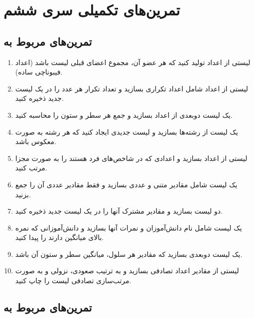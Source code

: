 \documentclass[a4paper,12pt]{article}
\begin{document}
	
	
	\newpage
	\section*{تمرین‌های تکمیلی سری ششم}
	
	\subsection*{تمرین‌های مربوط به }
	
	\begin{enumerate}
		\item لیستی از اعداد تولید کنید که هر عضو آن، مجموع اعضای قبلی لیست باشد (اعداد فیبوناچی ساده).
		\item لیستی از اعداد شامل اعداد تکراری بسازید و تعداد تکرار هر عدد را در یک لیست جدید ذخیره کنید.
		\item یک لیست دو‌بعدی از اعداد بسازید و جمع هر سطر و ستون را محاسبه کنید.
		\item یک لیست از رشته‌ها بسازید و لیست جدیدی ایجاد کنید که هر رشته به صورت معکوس باشد.
		\item لیستی از اعداد بسازید و اعدادی که در شاخص‌های فرد هستند را به صورت مجزا مرتب کنید.
		\item یک لیست شامل مقادیر متنی و عددی بسازید و فقط مقادیر عددی آن را جمع بزنید.
		\item دو لیست بسازید و مقادیر مشترک آنها را در یک لیست جدید ذخیره کنید.
		\item یک لیست شامل نام دانش‌آموزان و نمرات آنها بسازید و دانش‌آموزانی که نمره بالای میانگین دارند را پیدا کنید.
		\item یک لیست دو‌بعدی بسازید که مقادیر هر سلول، میانگین سطر و ستون آن باشد.
		\item لیستی از مقادیر اعداد تصادفی بسازید و به ترتیب صعودی، نزولی و به صورت مرتب‌سازی تصادفی لیست را چاپ کنید.
	\end{enumerate}
	
	\subsection*{تمرین‌های مربوط به }
	
\end{document}
